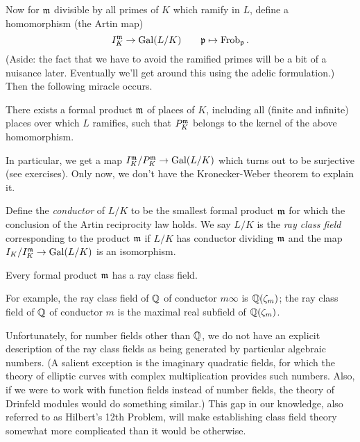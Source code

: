 Now for $\mathfrak{m}$ divisible by all primes of $K$ which ramify in $L$,
define a homomorphism (the Artin map)
\[
I_K^{\mathfrak{m}} \to \operatorname{Gal}(L/K) \qquad \mathfrak{p} \mapsto \operatorname{Frob}_{\mathfrak{p}}.
\]
(Aside: the fact that we have to avoid the ramified primes will be a bit
of a nuisance later. Eventually
we'll get around this using the adelic formulation.)
Then the following miracle occurs.
\begin{theorem}
There exists a formal product $\mathfrak{m}$ of places of $K$, including all
(finite and infinite) places over which $L$ ramifies, such that
$P_K^{\mathfrak{m}}$ belongs to the kernel of the above homomorphism.
\end{theorem}
In particular, we get a map $I_K^{\mathfrak{m}}/P_K^{\mathfrak{m}} \to \operatorname{Gal}(L/K)$ which
turns out to be surjective (see exercises).
Only now, we don't have the Kronecker-Weber theorem to explain it.

Define the \emph{conductor} of $L/K$ to be the smallest formal product $\mathfrak{m}$
for which the conclusion of the Artin reciprocity law holds.
We say $L/K$ is the \emph{ray class field} corresponding to the product
$\mathfrak{m}$ if $L/K$ has conductor dividing $\mathfrak{m}$ and the map
$I_K/I_K^{\mathfrak{m}} \to \operatorname{Gal}(L/K)$ is an isomorphism.
\begin{theorem}
Every formal product $\mathfrak{m}$ has a ray class field.
\end{theorem}
For example, the ray class field of $\mathbb{Q}$ of conductor $m\infty$ is
$\mathbb{Q}(\zeta_m)$; the ray class field of $\mathbb{Q}$ of conductor $m$ is
the maximal real subfield of $\mathbb{Q}(\zeta_m)$. 

Unfortunately, for number fields other than $\mathbb{Q}$, we do not have an
explicit description of the ray class fields as being generated by
particular algebraic numbers. (A salient exception is the imaginary
quadratic fields, for which the theory of elliptic curves
with complex multiplication provides such numbers. Also, if we were to
work with function fields instead of number fields, the theory of
Drinfeld modules would do something similar.) This gap in our
knowledge, also referred to as Hilbert's 12th Problem,
will make establishing class field theory somewhat more complicated than
it would be otherwise.



